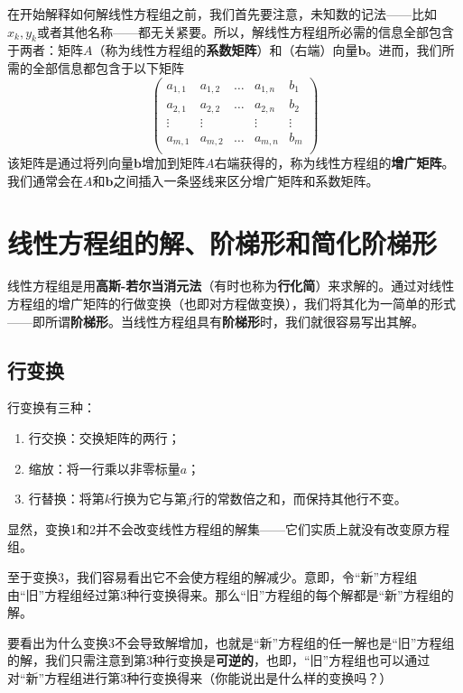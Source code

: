 在开始解释如何解线性方程组之前，我们首先要注意，未知数的记法——比如$x_k,y_k$或者其他名称——都无关紧要。所以，解线性方程组所必需的信息全部包含于两者：矩阵$A$（称为线性方程组的{\bf 系数矩阵}）和（右端）向量$\mathbf{b}$。进而，我们所需的全部信息都包含于以下矩阵
\pagebreak
\[\left(
  \begin{array}{cccc|c}
      a_{1,1} & a_{1,2} & \ldots & a_{1,n} & b_1    \\
      a_{2,1} & a_{2,2} & \ldots & a_{2,n} & b_2    \\
      \vdots  & \vdots  &        & \vdots  & \vdots \\
      a_{m,1} & a_{m,2} & \ldots & a_{m,n} & b_m    \\
    \end{array}
  \right)\]
该矩阵是通过将列向量$\mathbf{b}$增加到矩阵$A$右端获得的，称为线性方程组的{\bf 增广矩阵}。我们通常会在$A$和$\mathbf{b}$之间插入一条竖线来区分增广矩阵和系数矩阵。


\section{线性方程组的解、阶梯形和简化阶梯形}

线性方程组是用{\bf 高斯-若尔当消元法}（有时也称为{\bf 行化简}）来求解的。通过对线性方程组的增广矩阵的行做变换（也即对方程做变换），我们将其化为一简单的形式——即所谓{\bf 阶梯形}。当线性方程组具有{\bf 阶梯形}时，我们就很容易写出其解。

\subsection{行变换}

行变换有三种：
\begin{enumerate}
  \item 行交换：交换矩阵的两行；
  \item 缩放：将一行乘以非零标量$a$；
  \item 行替换：将第$k$行换为它与第$j$行的常数倍之和，而保持其他行不变。
\end{enumerate}

显然，变换1和2并不会改变线性方程组的解集——它们实质上就没有改变原方程组。

至于变换3，我们容易看出它不会使方程组的解减少。意即，令“新”方程组由“旧”方程组经过第3种行变换得来。那么“旧”方程组的每个解都是“新”方程组的解。

要看出为什么变换3不会导致解增加，也就是“新”方程组的任一解也是“旧”方程组的解，我们只需注意到第3种行变换是{\bf 可逆的}，也即，“旧”方程组也可以通过对“新”方程组进行第3种行变换得来（你能说出是什么样的变换吗？）

